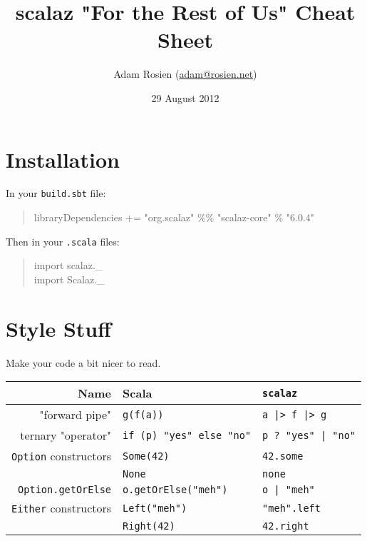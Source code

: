 \documentclass{tufte-handout}
\title{scalaz "For the Rest of Us" Cheat Sheet}
\author[Adam Rosien]{Adam Rosien (\href{mailto:adam@rosien.net}{adam@rosien.net})}
\date{29 August 2012}  %
\begin{document}
\maketitle%


\section{Installation}\label{sec:installation}

In your \texttt{build.sbt} file:

\begin{fullwidth}
\begin{quote}
  \ttfamily
   libraryDependencies += "org.scalaz" \%\% "scalaz-core" \% "6.0.4"
\end{quote}
\end{fullwidth}

\noindent Then in your \texttt{.scala} files: 

\begin{quote}
  \ttfamily import scalaz.\_\\
  import Scalaz.\_
\end{quote}

\section{Style Stuff}\label{sec:style}

Make your code a bit nicer to read.

\begin{table}[ht]
  \centering
  \selectfont
  \begin{tabular}{rll}
    \toprule
    Name & Scala & \texttt{scalaz} \\
    \midrule
    "forward pipe"& \texttt{g(f(a))} & \texttt{a |> f |> g}  \\
    ternary "operator" & \texttt{if (p) "yes" else "no"} & \texttt{p ? "yes" | "no"} \\
    \texttt{Option} constructors & \texttt{Some(42)} & \texttt{42.some} \\
                                   & \texttt{None} & \texttt{none} \\
    \texttt{Option.getOrElse} & \texttt{o.getOrElse("meh")} & \texttt{o | "meh"} \\
    \texttt{Either} constructors & \texttt{Left("meh")} & \texttt{"meh".left} \\
                                  & \texttt{Right(42)} & \texttt{42.right} \\
    \bottomrule
  \end{tabular}
  \label{tab:normaltab}
\end{table}
\end{document}
